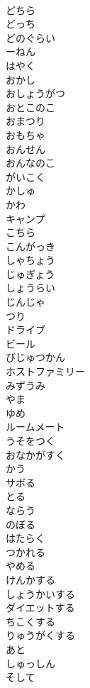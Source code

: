 \documentclass[8pt]{extreport}
\begin{document}
\begin{CJK}{UTF8}{min}
\\	どちら	
\\	どっち	
\\	どのぐらい	
\\	ーねん	
\\	はやく	
\\	おかし	
\\	おしょうがつ	
\\	おとこのこ	
\\	おまつり	
\\	おもちゃ	
\\	おんせん	
\\	おんなのこ	
\\	がいこく	
\\	かしゅ	
\\	かわ	
\\	キャンプ	
\\	こちら	
\\	こんがっき	
\\	しゃちょう	
\\	じゅぎょう	
\\	しょうらい	
\\	じんじゃ	
\\	つり	
\\	ドライブ	
\\	ビール	
\\	びじゅつかん	
\\	ホストファミリー	
\\	みずうみ	
\\	やま	
\\	ゆめ	
\\	ルームメート	
\\	うそをつく	
\\	おなかがすく	
\\	かう	
\\	サボる	
\\	とる	
\\	ならう	
\\	のぼる	
\\	はたらく	
\\	つかれる	
\\	やめる	
\\	けんかする	
\\	しょうかいする	
\\	ダイエットする	
\\	ちこくする	
\\	りゅうがくする	
\\	あと	
\\	しゅっしん	
\\	そして	

\end{CJK}
\end{document}
